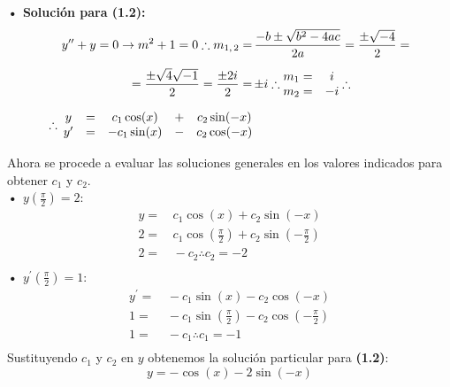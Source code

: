 \documentclass[letterpaper, 12pt]{article}
\begin{document}
{\large \textbf{• Solución para (1.2):}
\begin{equation*}
    \begin{aligned}
        y^{\prime\prime}+y=0\rightarrow m^2+1=0\therefore m_{1,\,2}=&\,{-b\pm\sqrt{b^2-4ac}\over 2a}={\pm \sqrt{-4}\over 2}=\\[5pt]
        ={\pm \sqrt{4}\sqrt{-1}\over 2}={\pm 2 i\over 2}=&\, {\pm i} \therefore 
        \begin{matrix}
            m_1=&i\\
            m_2=&-i
        \end{matrix} \therefore\\[5pt]
        \therefore\: \begin{matrix}
            y&=&c_1\cos (x) &+& c_2\sin (-x)\\
            y^{\prime}&=&-c_1\sin (x) &-&c_2\cos (-x)
        \end{matrix}&\\[5pt]
    \end{aligned}
\end{equation*}
Ahora se procede a evaluar las soluciones generales en los valores indicados para obtener \(c_1\) y \(c_2\).\\\newline
\textbf{• \(y(\frac{\pi}{2})=2:\)}\\
\begin{equation*}
    \begin{aligned}
        y=&\, c_1\cos (x) + c_2\sin (-x)\\[5pt]
        2=&\, c_1\cos \left(\frac{\pi}{2}\right) + c_2\sin \left(-\frac{\pi}{2}\right)\\[5pt]
        2=&\, -c_2\therefore c_2=-2\\[5pt]
    \end{aligned}
\end{equation*}
\textbf{• \(y^{\prime}(\frac{\pi}{2})=1:\)}\\
\begin{equation*}
    \begin{aligned}
        y^{\prime}=&\,-c_1\sin (x) -c_2\cos (-x)\\[5pt]
        1=&\, -c_1\sin \left(\frac{\pi}{2}\right) - c_2\cos \left(-\frac{\pi}{2}\right)\\[5pt]
        1=&\, -c_1 \therefore c_1=-1\\[5pt]
    \end{aligned}
\end{equation*}
Sustituyendo \(c_1\) y \(c_2\) en \(y\) obtenemos la solución particular para \textbf{(1.2)}:
\[y=-\cos (x) -2\sin (-x)\]
}
\end{document}
